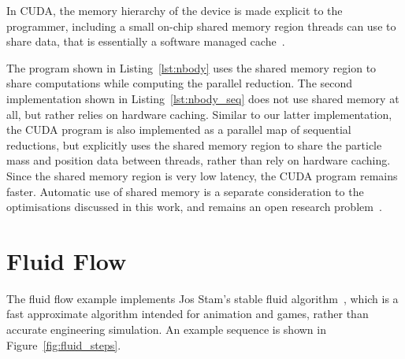 In CUDA, the memory hierarchy of the device is made explicit to the programmer,
including a small on-chip shared memory region threads can use to share data,
that is essentially a software managed cache~\cite{NVIDIA:2012wf}.

The program shown in Listing~\ref{lst:nbody} uses the shared memory region to
share computations while computing the parallel reduction. The second
implementation shown in Listing~\ref{lst:nbody_seq} does not use shared memory
at all, but rather relies on hardware caching. Similar to our latter
implementation, the CUDA program is also implemented as a parallel map of
sequential reductions, but explicitly uses the shared memory region to share the
particle mass and position data between threads, rather than rely on hardware
caching. Since the shared memory region is very low latency, the CUDA program
remains faster. Automatic use of shared memory is a separate consideration to
the optimisations discussed in this work, and remains an open research
problem~\cite{Ma:2010ft}.



\section{Fluid Flow}
\label{sec:fluid}

The fluid flow example implements Jos Stam's stable fluid
algorithm~\cite{Stam:1999ey}, which is a fast approximate algorithm intended for
animation and games, rather than accurate engineering simulation. An example
sequence is shown in Figure~\ref{fig:fluid_steps}.

